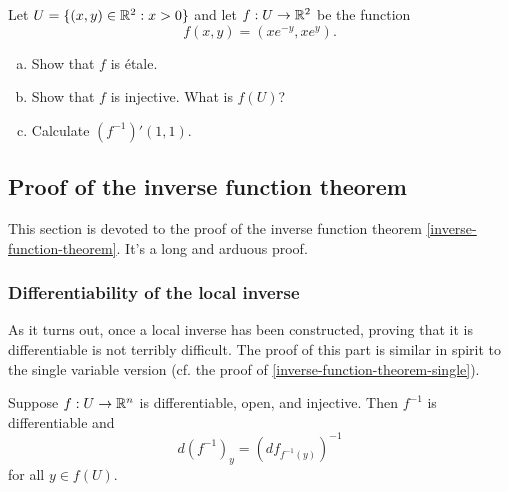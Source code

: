 \begin{exercise}
	Let $U = \{(x,y) \in \mathbb{R}^2 : x > 0\}$ and let $f : U \to \mathbb{R}^2$ be the function \[ f(x,y) = (xe^{-y}, xe^y). \]
	\begin{enumerate}[(a)]
		\item Show that $f$ is \'etale. 
		\item Show that $f$ is injective. What is $f(U)$?
		\item Calculate $(f^{-1})'(1,1)$. 
	\end{enumerate}
\end{exercise}

\subsection{Proof of the inverse function theorem \starred}

This section is devoted to the proof of the inverse function theorem \ref{inverse-function-theorem}. It's a long and arduous proof.

\subsubsection*{Differentiability of the local inverse}

As it turns out, once a local inverse has been constructed, proving that it is differentiable is not terribly difficult. The proof of this part is similar in spirit to the single variable version (cf. the proof of \cref{inverse-function-theorem-single}).

\begin{proposition} \label{inverse-differentiable}
	Suppose $f : U \to \mathbb{R}^n$ is differentiable, open, and injective. Then $f^{-1}$ is differentiable and \[ d(f^{-1})_y = (df_{f^{-1}(y)})^{-1} \] for all $y \in f(U)$. 
\end{proposition}

